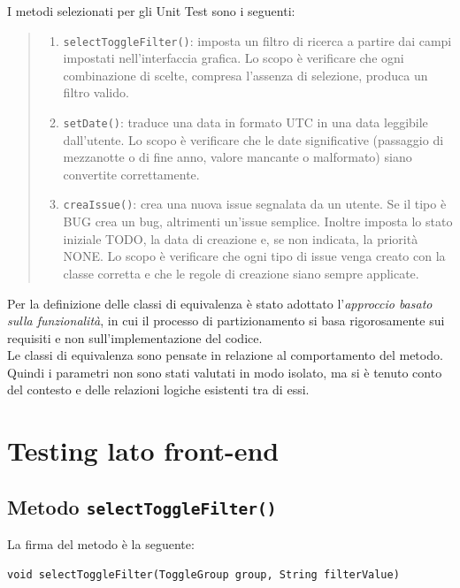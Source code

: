 I metodi selezionati per gli Unit Test sono i seguenti:

\begin{quote}
\begin{enumerate}[label=\textit{\arabic*}]
   \item \texttt{selectToggleFilter()}: imposta un filtro di ricerca a partire 
   dai campi impostati nell’interfaccia grafica. Lo scopo è verificare che ogni combinazione di scelte, compresa l’assenza di selezione, produca un filtro valido.
  
  \item \texttt{setDate()}: traduce una data in formato UTC in una data leggibile dall'utente. 
  Lo scopo è verificare che le date significative (passaggio di mezzanotte o di fine anno, valore mancante o malformato) 
  siano convertite correttamente.
  
  \item \texttt{creaIssue()}: crea una nuova issue segnalata da un utente. Se il tipo è BUG crea un bug, altrimenti un'issue semplice. Inoltre imposta lo stato iniziale TODO, la data di creazione e, se non indicata, la priorità NONE.
  Lo scopo è verificare che ogni tipo di issue venga creato con la classe corretta e che le regole di creazione siano sempre applicate.
\end{enumerate} 
\end{quote}

\noindent Per la definizione delle classi di equivalenza è stato adottato l'\textit{approccio basato sulla funzionalità}, 
in cui il processo di partizionamento si basa rigorosamente sui requisiti
e non sull'implementazione del codice. \\
\indent Le classi di equivalenza sono pensate in relazione al
comportamento del metodo. Quindi i parametri non sono stati valutati in modo isolato, ma si
è tenuto conto del contesto e delle relazioni logiche esistenti tra di essi.

\section{Testing lato front-end}

\subsection{Metodo \texttt{selectToggleFilter()}}

\noindent La firma del metodo è la seguente:

\begin{minipage}{\linewidth}
\centering\begin{verbatim}
void selectToggleFilter(ToggleGroup group, String filterValue)
\end{verbatim}
\end{minipage}

